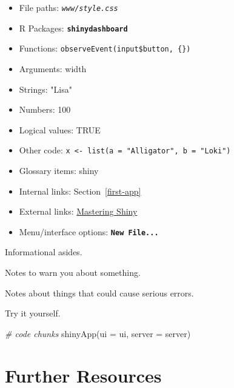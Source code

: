 \documentclass[
  oneside]{book}
\newenvironment{Shaded}{\begin{snugshade}}{\end{snugshade}}
\newcommand{\AttributeTok}[1]{\textcolor[rgb]{0.77,0.63,0.00}{#1}}
\newcommand{\CommentTok}[1]{\textcolor[rgb]{0.56,0.35,0.01}{\textit{#1}}}
\newcommand{\ConstantTok}[1]{\textcolor[rgb]{0.00,0.00,0.00}{#1}}
\newcommand{\DecValTok}[1]{\textcolor[rgb]{0.00,0.00,0.81}{#1}}
\newcommand{\FunctionTok}[1]{\textcolor[rgb]{0.00,0.00,0.00}{#1}}
\newcommand{\NormalTok}[1]{#1}
\newcommand{\StringTok}[1]{\textcolor[rgb]{0.31,0.60,0.02}{#1}}
\providecommand{\tightlist}{%
  \setlength{\itemsep}{0pt}\setlength{\parskip}{0pt}}
\begin{document}
\begin{itemize}
\tightlist
\item
  File paths: \textit{\texttt{www/style.css}}
\item
  R Packages: \textbf{\texttt{shinydashboard}}
\item
  Functions: \texttt{observeEvent}\texttt{(input\$button,\ \{\})}
\item
  Arguments: \AttributeTok{width}
\item
  Strings: \StringTok{"Lisa"}
\item
  Numbers: \DecValTok{100}
\item
  Logical values: \ConstantTok{TRUE}
\item
  Other code: \texttt{x\ \textless{}-\ list(a\ =\ "Alligator",\ b\ =\ "Loki")}
\item
  Glossary items: shiny
\item
  Internal links: Section~\ref{first-app}
\item
  External links: \href{https://mastering-shiny.org/}{Mastering Shiny}
\item
  Menu/interface options: \textbf{\texttt{New\ File...}}
\end{itemize}

\begin{info}
Informational asides.

\end{info}

\begin{warning}
Notes to warn you about something.

\end{warning}

\begin{dangerous}
Notes about things that could cause serious errors.

\end{dangerous}

\begin{try}
Try it yourself.

\end{try}

\begin{Shaded}
\begin{Highlighting}[]
\CommentTok{\# code chunks}
\FunctionTok{shinyApp}\NormalTok{(}\AttributeTok{ui =}\NormalTok{ ui, }\AttributeTok{server =}\NormalTok{ server)}
\end{Highlighting}
\end{Shaded}

\hypertarget{further-resources}{%
\section{Further Resources}\label{further-resources}}
\end{document}
